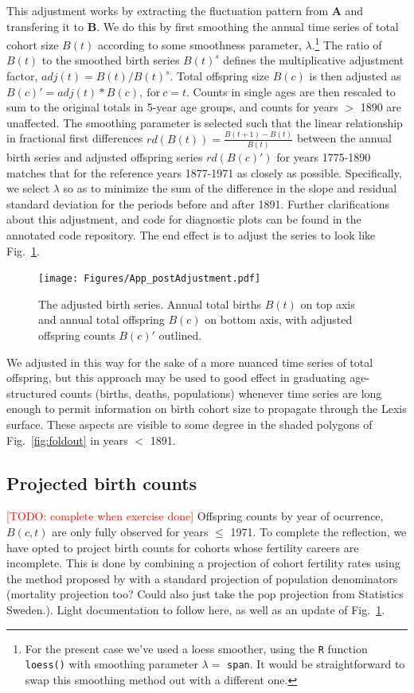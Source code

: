 \documentclass{article}
\newcommand\todo[1]{\textcolor{red}{[TODO: #1]}}
\begin{document}
\begin{appendix}
This adjustment works by extracting the fluctuation pattern from \textbf{A} and transfering it to \textbf{B}. We do this by first smoothing the annual time series of total cohort size $B(t)$ according to some smoothness parameter, $\lambda$.\footnote{For the present case we've used a loess smoother, using the \texttt{R} function \texttt{loess()} with smoothing parameter $\lambda =$ \texttt{span}. It would be straightforward to swap this smoothing method out with a different one.} The ratio of $B(t)$ to the smoothed birth series $B(t)^s$ defines the multiplicative adjustment factor, $adj(t) = B(t)/B(t)^s$. Total offspring size $B(c)$ is then adjusted as $B(c)' = adj(t)*B(c), \mathrm{~for~} c = t$. Counts in single ages are then rescaled to sum to the original totals in 5-year age groups, and counts for years $>$ 1890 are unaffected. The smoothing parameter is selected such that the linear relationship in fractional first differences $rd(B(t)) = \frac{B(t+1)-B(t)}{B(t)}$ between the annual birth series and adjusted offspring series $rd(B(c)')$ for years 1775-1890 matches that for the reference years 1877-1971 as closely as possible. Specifically, we select $\lambda$ so as to minimize the sum of the difference in the slope and residual standard deviation for the periods before and after 1891. Further clarifications about this adjustment, and code for diagnostic plots can be found in the annotated code repository. The end effect is to adjust the series to look like Fig.~\ref{fig:better}.

\begin{figure}[ht!]
\centering
 \texttt{[image: Figures/App\_postAdjustment.pdf]}
\caption{The adjusted birth series. Annual total births $B(t)$ on top axis and annual total offspring $B(c)$ on bottom axis, with adjusted offspring counts $B(c)'$ outlined.}
\label{fig:better}
\end{figure}
\end{appendix}

We adjusted in this way for the sake of a more nuanced time series of total offspring, but this approach may be used to good effect in graduating age-structured counts (births, deaths, populations) whenever time series are long enough to permit information on birth cohort size to propagate through the Lexis surface. These aspects are visible to some degree in the shaded polygons of Fig.~\ref{fig:foldout} in years $<$ 1891.

\subsection{Projected birth counts}
\label{sec:proj}
\todo{complete when exercise done}
Offspring counts by year of ocurrence, $B(c,t)$ are only fully observed for years $\le$ 1971. To complete the reflection, we have opted to project birth counts for cohorts whose fertility careers are incomplete. This is done by combining a projection of cohort fertility rates using the method proposed by \citet{de1985time} with a standard projection of population denominators (mortality projection too? Could also just take the pop projection from Statistics Sweden.). Light documentation to follow here, as well as an update of Fig.~\ref{fig:better}.
\end{document}
